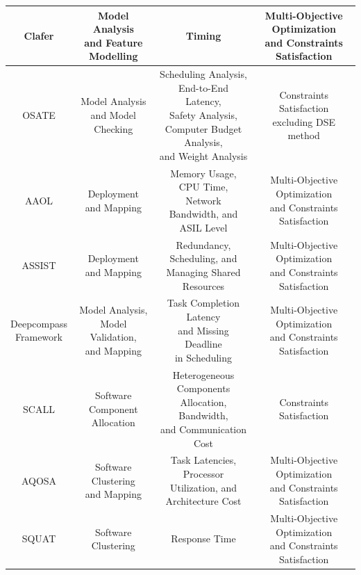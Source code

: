 \begin{longtable}{@{}>{\footnotesize}c >{\footnotesize}c >{\footnotesize}c >{\footnotesize}c@{}}
Clafer &  \makecell{Model Analysis\\ and Feature Modelling} & Timing &\makecell{Multi-Objective Optimization \\and Constraints Satisfaction} \\ \midrule
OSATE & \makecell{Model Analysis \\and Model Checking} & \makecell{Scheduling Analysis,\\ End-to-End Latency,\\ Safety Analysis,\\ Computer Budget Analysis,\\ and Weight Analysis}  & \makecell{Constraints Satisfaction\\ excluding DSE method}\\ \midrule
AAOL & \makecell{Deployment \\and Mapping} & \makecell{Memory Usage, CPU Time, \\Network Bandwidth, and\\ ASIL Level}  &  \makecell{Multi-Objective Optimization \\and Constraints Satisfaction}\\ \midrule
ASSIST & \makecell{Deployment \\and Mapping} &\makecell{ Redundancy, Scheduling, and \\Managing Shared Resources}  & \makecell{Multi-Objective Optimization \\and Constraints Satisfaction}\\ \midrule
\makecell {Deepcompass \\Framework} & \makecell{Model Analysis,\\ Model Validation,\\ and Mapping} & \makecell{Task Completion Latency \\and Missing Deadline\\ in Scheduling}& \makecell{Multi-Objective  Optimization \\and Constraints Satisfaction}\\ \midrule
SCALL & \makecell{Software Component\\ Allocation} & \makecell{Heterogeneous Components\\ Allocation, Bandwidth, \\and Communication Cost} & Constraints Satisfaction\\ \midrule
AQOSA & \makecell{Software Clustering\\ and Mapping} & \makecell{Task Latencies,\\ Processor Utilization, and\\ Architecture Cost}  & \makecell{Multi-Objective Optimization \\and Constraints Satisfaction}\\
\midrule
SQUAT & Software Clustering & Response Time & \makecell{Multi-Objective Optimization \\and Constraints Satisfaction}\\
\bottomrule
\end{longtable}

